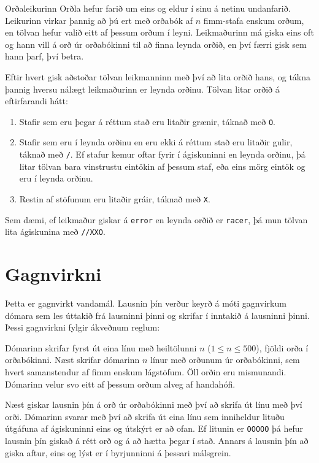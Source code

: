 %
Orðaleikurinn Orðla hefur farið um eins og eldur í sinu á netinu undanfarið.
Leikurinn virkar þannig að þú ert með orðabók af $n$ fimm-stafa enskum orðum,
en tölvan hefur valið eitt af þessum orðum í leyni. Leikmaðurinn má giska eins
oft og hann vill á orð úr orðabókinni til að finna leynda orðið, en því færri
gisk sem hann þarf, því betra.

Eftir hvert gisk aðstoðar tölvan leikmanninn með því að lita orðið hans, og
tákna þannig hversu nálægt leikmaðurinn er leynda orðinu. Tölvan litar orðið á
eftirfarandi hátt:

\begin{enumerate}
    \item Stafir sem eru þegar á réttum stað eru litaðir grænir, táknað með \texttt{O}.
    \item Stafir sem eru í leynda orðinu en eru ekki á réttum stað eru litaðir
        gulir, táknað með \texttt{/}. Ef stafur kemur oftar fyrir í
        ágiskuninni en leynda orðinu, þá litar tölvan bara vinstrustu eintökin
        af þessum staf, eða eins mörg eintök og eru í leynda orðinu.
    \item Restin af stöfunum eru litaðir gráir, táknað með \texttt{X}.
\end{enumerate}

Sem dæmi, ef leikmaður giskar á \texttt{error} en leynda orðið er
\texttt{racer}, þá mun tölvan lita ágiskunina með \texttt{//XXO}.

\section*{Gagnvirkni}
Þetta er gagnvirkt vandamál. Lausnin þín verður keyrð á móti gagnvirkum dómara
sem les úttakið frá lausninni þinni og skrifar í inntakið á lausninni þinni.
Þessi gagnvirkni fylgir ákveðnum reglum:

Dómarinn skrifar fyrst út eina línu með heiltölunni $n$ ($1 \leq n \leq 500$),
fjöldi orða í orðabókinni. Næst skrifar dómarinn $n$ línur með orðunum úr
orðabókinni, sem hvert samanstendur af fimm enskum lágstöfum. Öll orðin eru
mismunandi. Dómarinn velur svo eitt af þessum orðum alveg af handahófi.

Næst giskar lausnin þín á orð úr orðabókinni með því að skrifa út línu með því
orði. Dómarinn svarar með því að skrifa út eina línu sem inniheldur lituðu
útgáfuna af ágiskuninni eins og útskýrt er að ofan. Ef litunin er
\texttt{OOOOO} þá hefur lausnin þín giskað á rétt orð og á að hætta þegar í
stað. Annars á lausnin þín að giska aftur, eins og lýst er í byrjunninni á
þessari málsgrein.

